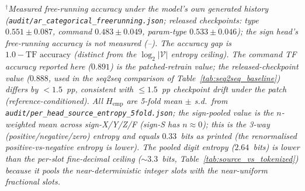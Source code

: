 \begin{table}[ht]
\footnotesize\textit{$^{\dagger}$Measured free-running accuracy under the model's own generated history (\texttt{audit/ar\_categorical\_freerunning.json}; released checkpoints: type $0.551 \pm 0.087$, command $0.483 \pm 0.049$, param-type $0.533 \pm 0.046$); the sign head's free-running accuracy is not measured (--). The accuracy gap is $1.0-\text{TF accuracy}$ (distinct from the $\log_2|\mathcal{V}|$ entropy ceiling). The command TF accuracy reported here ($0.891$) is the patched-retrain value; the released-checkpoint value ($0.888$, used in the seq2seq comparison of Table~\ref{tab:seq2seq_baseline}) differs by $<\!1.5$~pp, consistent with $\le\!1.5$~pp checkpoint drift under the patch (reference-conditioned). All $H_{\text{emp}}$ are 5-fold mean $\pm$ s.d.\ from \texttt{audit/per\_head\_source\_entropy\_5fold.json}; the sign-pooled value is the $n$-weighted mean across sign-X/Y/Z/F (sign-S has $n\!\approx\!0$); this is the 3-way (positive/negative/zero) entropy and equals $0.33$~bits as printed (the renormalised positive-vs-negative entropy is lower). The pooled digit entropy ($2.64$~bits) is lower than the per-slot fine-decimal ceiling ($\sim\!3.3$~bits, Table~\ref{tab:source_vs_tokenized}) because it pools the near-deterministic integer slots with the near-uniform fractional slots.}
\end{table}
